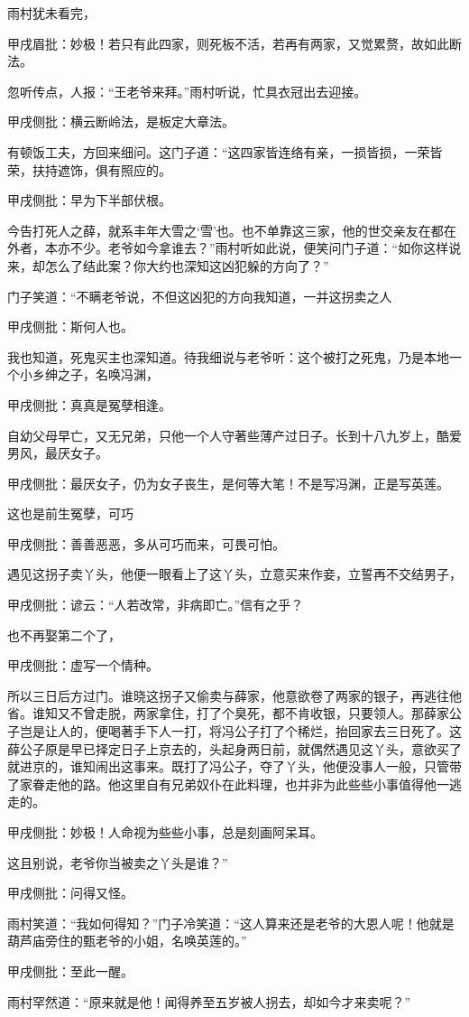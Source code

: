 \begin{parag}
    雨村犹未看完，\begin{note}甲戌眉批：妙极！若只有此四家，则死板不活，若再有两家，又觉累赘，故如此断法。\end{note}忽听传点，人报：“王老爷来拜。”雨村听说，忙具衣冠出去迎接。\begin{note}甲戌侧批：横云断岭法，是板定大章法。\end{note}有顿饭工夫，方回来细问。这门子道：“这四家皆连络有亲，一损皆损，一荣皆荣，扶持遮饰，俱有照应的。\begin{note}甲戌侧批：早为下半部伏根。\end{note}今告打死人之薛，就系丰年大雪之‘雪’也。也不单靠这三家，他的世交亲友在都在外者，本亦不少。老爷如今拿谁去？”雨村听如此说，便笑问门子道：“如你这样说来，却怎么了结此案？你大约也深知这凶犯躲的方向了？”
\end{parag}


\begin{parag}
    门子笑道：“不瞒老爷说，不但这凶犯的方向我知道，一并这拐卖之人\begin{note}甲戌侧批：斯何人也。\end{note}我也知道，死鬼买主也深知道。待我细说与老爷听：这个被打之死鬼，乃是本地一个小乡绅之子，名唤冯渊，\begin{note}甲戌侧批：真真是冤孽相逢。\end{note}自幼父母早亡，又无兄弟，只他一个人守著些薄产过日子。长到十八九岁上，酷爱男风，最厌女子。\begin{note}甲戌侧批：最厌女子，仍为女子丧生，是何等大笔！不是写冯渊，正是写英莲。\end{note}这也是前生冤孽，可巧\begin{note}甲戌侧批：善善恶恶，多从可巧而来，可畏可怕。\end{note}遇见这拐子卖丫头，他便一眼看上了这丫头，立意买来作妾，立誓再不交结男子，\begin{note}甲戌侧批：谚云：“人若改常，非病即亡。”信有之乎？\end{note}也不再娶第二个了，\begin{note}甲戌侧批：虚写一个情种。\end{note}所以三日后方过门。谁晓这拐子又偷卖与薛家，他意欲卷了两家的银子，再逃往他省。谁知又不曾走脱，两家拿住，打了个臭死，都不肯收银，只要领人。那薛家公子岂是让人的，便喝著手下人一打，将冯公子打了个稀烂，抬回家去三日死了。这薛公子原是早已择定日子上京去的，头起身两日前，就偶然遇见这丫头，意欲买了就进京的，谁知闹出这事来。既打了冯公子，夺了丫头，他便没事人一般，只管带了家眷走他的路。他这里自有兄弟奴仆在此料理，也并非为此些些小事值得他一逃走的。\begin{note}甲戌侧批：妙极！人命视为些些小事，总是刻画阿呆耳。\end{note}这且别说，老爷你当被卖之丫头是谁？”\begin{note}甲戌侧批：问得又怪。\end{note}雨村笑道：“我如何得知？”门子冷笑道：“这人算来还是老爷的大恩人呢！他就是葫芦庙旁住的甄老爷的小姐，名唤英莲的。”\begin{note}甲戌侧批：至此一醒。\end{note}雨村罕然道：“原来就是他！闻得养至五岁被人拐去，却如今才来卖呢？”
\end{parag}


